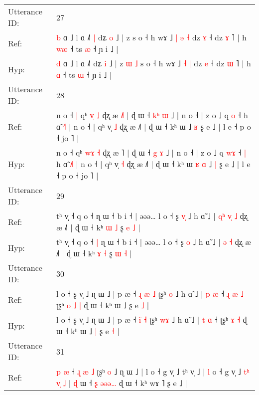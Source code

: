 \documentclass[10pt]{article}
\DeclareRobustCommand{\hl}[1]{{\textcolor{red}{#1}}}
\begin{document}
\begin{longtable}{ll}
 \\
\midrule
Utterance ID: & 27 \\
Ref: & \hl{b} ɑ ˩ l ɑ ˩˥\hl{ }\hl{|} dʑ \hl{o} ˩ | z\hl{}\hl{}\hl{}\hl{} s o ˧ h wɤ ˩\hl{ }\hl{|} \hl{ə} \hl{˧} dz \hl{ɤ} ˧ dz \hl{ɤ} ˥ | h \hl{w}\hl{æ} ˧ ts \hl{æ} ˧ ɲ i ˩ |
 \\
Hyp: & \hl{d} ɑ ˩ l ɑ ˩˥\hl{}\hl{} dʑ \hl{i} ˩ | z\hl{ }\hl{ɯ}\hl{ }\hl{˩} s o ˧ h wɤ ˩\hl{}\hl{} \hl{˧} \hl{|} dz \hl{e} ˧ dz \hl{ɯ} ˥ | h \hl{}\hl{ɑ} ˧ ts \hl{ɯ} ˧ ɲ i ˩ |
 \\
\midrule
Utterance ID: & 28 \\
Ref: & n o ˧\hl{ }\hl{|} qʰ \hl{v}\hl{̩} \hl{˩} ɖʐ æ \hl{˩}˥ | ɖ ɯ ˧ \hl{k}\hl{ʰ} \hl{ɯ} ˩ | n o ˧ | z o ˩ q \hl{}\hl{o} ˧\hl{}\hl{} h ɑ̃ \hl{˧}˥ | n o ˧ | qʰ v̩ \hl{˩} ɖʐ æ ˩˥ | ɖ ɯ ˧ kʰ ɯ\hl{}\hl{}\hl{}\hl{} ˩ \hl{ʁ} ʂ e ˩ | l e ˧ p o ˧ jo ˥ |
 \\
Hyp: & n o ˧\hl{}\hl{} qʰ \hl{w}\hl{ɤ} \hl{˧} ɖʐ æ \hl{}˥ | ɖ ɯ ˧ \hl{}\hl{g} \hl{ɤ} ˩ | n o ˧ | z o ˩ q \hl{w}\hl{ɤ} ˧\hl{ }\hl{|} h ɑ̃ \hl{˩}˥ | n o ˧ | qʰ v̩ \hl{˧} ɖʐ æ ˩˥ | ɖ ɯ ˧ kʰ ɯ\hl{ }\hl{ʁ}\hl{ }\hl{ɑ} ˩ \hl{|} ʂ e ˩ | l e ˧ p o ˧ jo ˥ |
 \\
\midrule
Utterance ID: & 29 \\
Ref: & tʰ v̩ ˧ q o ˧\hl{}\hl{} ɳ ɯ ˧ b i ˧ | əəə… l o ˧ ʂ \hl{v}\hl{̩} ˩ h ɑ̃ ˩ |\hl{ }\hl{q}\hl{ʰ} \hl{v}\hl{̩} \hl{˩} ɖʐ æ ˩˥ | ɖ ɯ ˧ kʰ \hl{ɯ} \hl{˩} ʂ \hl{e} \hl{˩} |
 \\
Hyp: & tʰ v̩ ˧ q o ˧\hl{ }\hl{|} ɳ ɯ ˧ b i ˧ | əəə… l o ˧ ʂ \hl{}\hl{o} ˩ h ɑ̃ ˩ |\hl{}\hl{}\hl{} \hl{}\hl{ə} \hl{˧} ɖʐ æ ˩˥ | ɖ ɯ ˧ kʰ \hl{ɤ} \hl{˧} ʂ \hl{ɯ} \hl{˧} |
 \\
\midrule
Utterance ID: & 30 \\
Ref: & l o ˧ ʂ v̩ ˩ ɳ ɯ ˩ | p æ ˧ \hl{ɻ}\hl{ }\hl{æ} \hl{˩} ʈʂʰ \hl{}\hl{o} ˩ h ɑ̃ ˩ | \hl{p} \hl{æ} ˧\hl{ }\hl{ɻ}\hl{ }\hl{æ}\hl{ }\hl{˩} ʈʂʰ\hl{ }\hl{o} \hl{˩} \hl{|} ɖ ɯ ˧ kʰ ɯ ˩\hl{}\hl{} ʂ e \hl{˩} |
 \\
Hyp: & l o ˧ ʂ v̩ ˩ ɳ ɯ ˩ | p æ ˧ \hl{}\hl{i}\hl{̃} \hl{˧} ʈʂʰ \hl{w}\hl{ɤ} ˩ h ɑ̃ ˩ | \hl{t} \hl{ɑ} ˧\hl{}\hl{}\hl{}\hl{}\hl{}\hl{} ʈʂʰ\hl{}\hl{} \hl{ɤ} \hl{˧} ɖ ɯ ˧ kʰ ɯ ˩\hl{ }\hl{|} ʂ e \hl{˧} |
 \\
\midrule
Utterance ID: & 31 \\
Ref: & \hl{p} \hl{æ} ˧\hl{ }\hl{ɻ}\hl{ }\hl{æ}\hl{ }\hl{˩} ʈʂʰ \hl{o} ˩ ɳ ɯ ˩ | l o ˧ g v̩ ˩ tʰ v̩ ˩ | \hl{l} o ˧ g v̩ ˩ \hl{t}\hl{ʰ}\hl{ }\hl{v}\hl{̩} \hl{˩} | \hl{ɖ} ɯ ˧\hl{}\hl{} \hl{ʂ} \hl{ə}\hl{ə}\hl{ə}\hl{…} ɖ ɯ ˧ kʰ wɤ ˥ ʂ e ˩ |
 \\

\end{longtable}
\end{document}
